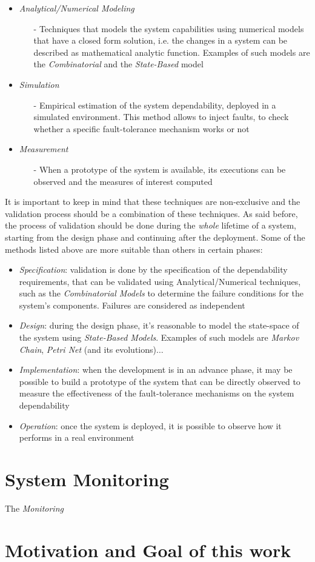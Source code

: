 \begin{itemize}
	\item \textsl{Analytical/Numerical Modeling}
	\begin{itemize}
		\item[-] Techniques that models the system capabilities using numerical models that have a closed form solution, i.e. the changes in a system can be described as mathematical analytic function. Examples of such models are the \textsl{Combinatorial} and the \textsl{State-Based} model
	\end{itemize}
	\item \textsl{Simulation}
	\begin{itemize}
		\item[-] Empirical estimation of the system dependability, deployed in a simulated environment. This method allows to inject faults, to check whether a specific fault-tolerance mechanism works or not		
	\end{itemize}
	\item \textsl{Measurement}
	\begin{itemize}
		\item[-] When a prototype of the system is available, its executions can be observed and the measures of interest computed
	\end{itemize}
\end{itemize}

It is important to keep in mind that these techniques are non-exclusive and the validation process should be a combination of these techniques. As said before, the process of validation should be done during the \textsl{whole} lifetime of a system, starting from the design phase and continuing after the deployment. Some of the methods listed above are more suitable than others in certain phases:

\begin{itemize}
	\item \textsl{Specification}: validation is done by the specification of the dependability requirements, that can be validated using Analytical/Numerical techniques, such as the \textsl{Combinatorial Models} to determine the failure conditions for the system's components. Failures are considered as independent
	\item \textsl{Design}: during the design phase, it's reasonable to model the state-space of the system using \textsl{State-Based Models}. Examples of such models are \textsl{Markov Chain}, \textsl{Petri Net} (and its evolutions)$\dots$
	\item \textsl{Implementation}: when the development is in an advance phase, it may be possible to build a prototype of the system that can be directly observed to measure the effectiveness of the fault-tolerance mechanisms on the system dependability
	\item \textsl{Operation}: once the system is deployed, it is possible to observe how it performs in a real environment
\end{itemize}

\section{System Monitoring}

The \textsl{Monitoring}

\section{Motivation and Goal of this work}
